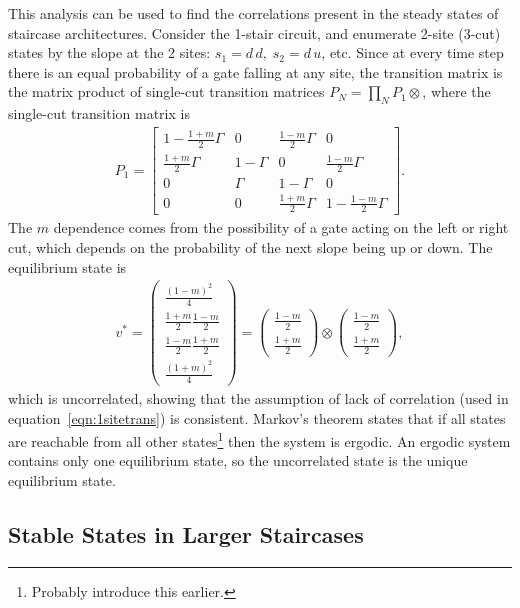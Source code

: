 \documentclass[11pt]{article}
\begin{document}
This analysis can be used to find the correlations present in the steady states of staircase architectures. Consider the 1-stair circuit, and enumerate 2-site (3-cut) states by the slope at the 2 sites: $s_1 = d\,d,\; s_2 = d\,u$, etc. Since at every time step there is an equal probability of a gate falling at any site, the transition matrix is the matrix product of single-cut transition matrices $P_{N} = \prod_NP_{1}\otimes$, where the single-cut transition matrix is 
\begin{align}
P_1 = \begin{bmatrix}
1-\frac{1+m}{2}\Gamma & 0      & \frac{1-m}{2}\Gamma & 0\\
\frac{1+m}{2}\Gamma & 1-\Gamma & 0                   & \frac{1-m}{2}\Gamma\\
0                   & \Gamma   & 1-\Gamma            & 0\\
0                   & 0        & \frac{1+m}{2}\Gamma & 1 - \frac{1-m}{2}\Gamma
\end{bmatrix}. \label{eqn:1sitetrans}
\end{align}
The $m$ dependence comes from the possibility of a gate acting on the left or right cut, which depends on the probability of the next slope being up or down.
The equilibrium state is
\begin{align}
v^* = \begin{pmatrix}
\frac{(1-m)^2}{4} \\ 
\frac{1+m}{2}\frac{1-m}{2} \\
\frac{1-m}{2}\frac{1+m}{2} \\
\frac{(1+m)^2}{4}
\end{pmatrix} = \begin{pmatrix}
\frac{1-m}{2} \\ \frac{1+m}{2}
\end{pmatrix} \otimes \begin{pmatrix}
\frac{1-m}{2} \\ \frac{1+m}{2}
\end{pmatrix},
\end{align}
which is uncorrelated, showing that the assumption of lack of correlation (used in equation~\ref{eqn:1sitetrans}) is consistent. Markov's theorem states that if all states are reachable from all other states\footnote{Probably introduce this earlier.} then the system is ergodic. An ergodic system contains only one equilibrium state, so the uncorrelated state is the unique equilibrium state.

\subsection{Stable States in Larger Staircases} \emph{} \label{sub:stairstate}
\end{document}
